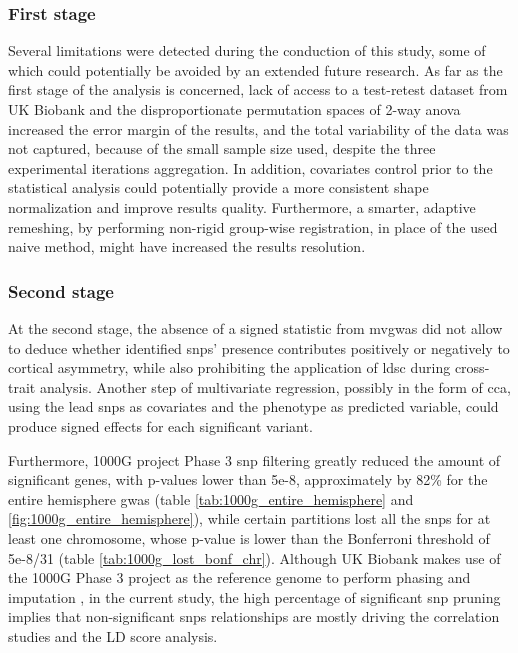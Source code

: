 \subsubsection{First stage}
Several limitations were detected during the conduction of this study, some of which could potentially be avoided by an extended future research. As far as the first stage of the analysis is concerned, lack of access to a test-retest dataset from UK Biobank and the disproportionate permutation spaces of 2-way \ac{anova} increased the error margin of the results, and the total variability of the data was not captured, because of the small sample size used, despite the three experimental iterations aggregation. In addition, covariates control prior to the statistical analysis could potentially provide a more consistent shape normalization and improve results quality. Furthermore, a smarter, adaptive remeshing, by performing non-rigid group-wise registration, in place of the used naive method, might have increased the results resolution.

\subsubsection{Second stage}
At the second stage, the absence of a signed statistic from \ac{mvgwas} did not allow to deduce whether identified \acp{snp}' presence contributes positively or negatively to cortical asymmetry, while also prohibiting the application of \ac{ldsc} during cross-trait analysis. Another step of multivariate regression, possibly in the form of \ac{cca}, using the lead \acp{snp} as covariates and the phenotype as predicted variable, could produce signed effects for each significant variant. 

Furthermore, 1000G project Phase 3 \ac{snp} filtering greatly reduced the amount of significant genes, with p-values lower than 5e-8, approximately by 82\% for the entire hemisphere \ac{gwas} (table \autoref{tab:1000g_entire_hemisphere} and \autoref{fig:1000g_entire_hemisphere}), while certain partitions lost all the \acp{snp} for at least one chromosome, whose p-value is lower than the Bonferroni threshold of 5e-8/31 (table \autoref{tab:1000g_lost_bonf_chr}). Although UK Biobank makes use of the 1000G Phase 3 project as the reference genome to perform phasing and imputation \cite{Bycroft2018}, in the current study, the high percentage of significant \ac{snp} pruning implies that non-significant \acp{snp} relationships are mostly driving the correlation studies and the LD score analysis.

